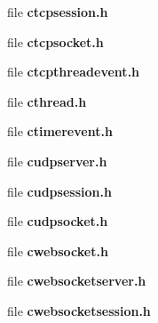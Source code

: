 \begin{DoxyCompactItemize}
\begin{DoxyCompactList}
 \end{DoxyCompactList}\item 
file {\bf ctcpsession.\+h}
\begin{DoxyCompactList}\small\item\em 

 \end{DoxyCompactList}\item 
file {\bf ctcpsocket.\+h}
\begin{DoxyCompactList}\small\item\em 

 \end{DoxyCompactList}\item 
file {\bf ctcpthreadevent.\+h}
\item 
file {\bf cthread.\+h}
\item 
file {\bf ctimerevent.\+h}
\item 
file {\bf cudpserver.\+h}
\item 
file {\bf cudpsession.\+h}
\item 
file {\bf cudpsocket.\+h}
\item 
file {\bf cwebsocket.\+h}
\begin{DoxyCompactList}\small\item\em 

 \end{DoxyCompactList}\item 
file {\bf cwebsocketserver.\+h}
\begin{DoxyCompactList}\small\item\em 

 \end{DoxyCompactList}\item 
file {\bf cwebsocketsession.\+h}
\begin{DoxyCompactList}\small\item\em 

 \end{DoxyCompactList}\end{DoxyCompactItemize}
